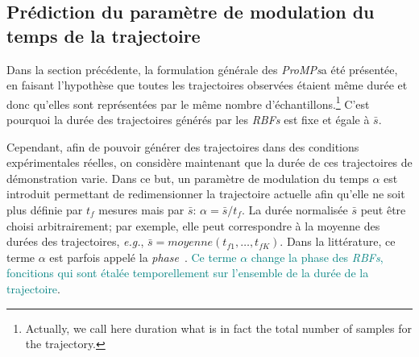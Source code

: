 \documentclass[utf8]{frontiersSCNS} %
\newcommand{\toimprove}[1]{\textcolor{teal}{#1}}
\newcommand{\todo}[1]{\textcolor{red}{\textbf{/*#1*/}}}
\begin{document}

\subsection{Prédiction du paramètre de modulation du temps de la trajectoire}\label{sec:predictDuration}
Dans la section précédente, la formulation générale des \textit{ProMPs}a été présentée, en faisant l'hypothèse que toutes les trajectoires observées étaient même durée et donc qu'elles sont représentées par le même nombre d'échantillons.\footnote{Actually, we call here duration what is in fact the total number of samples for the trajectory.}
C'est pourquoi la durée des trajectoires générés par les \textit{RBFs} est fixe et égale à $\bar{s}$. 

Cependant, afin de pouvoir générer des trajectoires dans des conditions expérimentales réelles, on considère maintenant que la durée de ces trajectoires de démonstration varie.
Dans ce but, un paramètre de modulation du temps $\alpha$ est introduit permettant de redimensionner la trajectoire actuelle afin qu'elle ne soit plus définie par $t_{f}$ mesures mais par $\bar{s}$: $\alpha = \bar{s} / t_{f}$.
La durée normalisée $\bar{s}$ peut être choisi arbitrairement; par exemple, elle peut correspondre à la moyenne des durées des trajectoires, \textit{e.g.}, $\bar{s}=moyenne(t_{f1},\ldots,t_{fK})$.
Dans la littérature, ce terme $\alpha$ est parfois appelé la \textit{phase}~\cite{paraschos2013probabilistic,paraschos2013probabilisticTrajectory}. 
\toimprove{Ce terme $\alpha$ change la phase des \textit{RBFs}, foncitions qui sont étalée temporellement sur l'ensemble de la durée de la trajectoire}.
\end{document}
